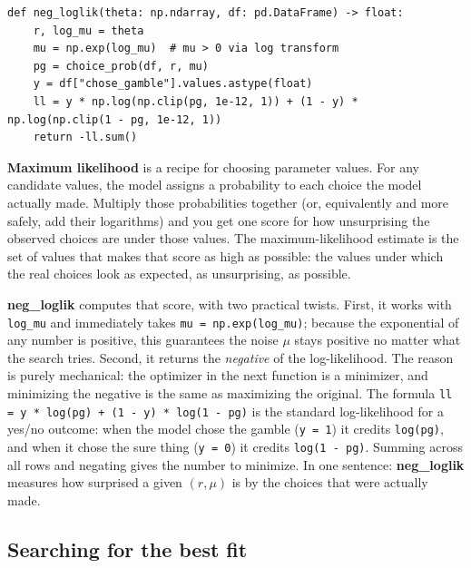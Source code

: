 \documentclass[11pt]{article}
\newcommand{\term}[1]{\textbf{\color{mossdk}#1}}
\newcommand{\file}[1]{\textbf{\ttfamily #1}}
\begin{document}
\begin{lstlisting}[style=py,firstnumber=49]
def neg_loglik(theta: np.ndarray, df: pd.DataFrame) -> float:
    r, log_mu = theta
    mu = np.exp(log_mu)  # mu > 0 via log transform
    pg = choice_prob(df, r, mu)
    y = df["chose_gamble"].values.astype(float)
    ll = y * np.log(np.clip(pg, 1e-12, 1)) + (1 - y) * np.log(np.clip(1 - pg, 1e-12, 1))
    return -ll.sum()
\end{lstlisting}

\begin{defbox}
\term{Maximum likelihood} is a recipe for choosing parameter values. For any candidate values, the
model assigns a probability to each choice the model actually made. Multiply those probabilities
together (or, equivalently and more safely, add their logarithms) and you get one score for how
unsurprising the observed choices are under those values. The maximum-likelihood estimate is the set
of values that makes that score as high as possible: the values under which the real choices look as
expected, as unsurprising, as possible.
\end{defbox}

\file{neg\_loglik} computes that score, with two practical twists. First, it works with
\verb|log_mu| and immediately takes \verb|mu = np.exp(log_mu)|; because the exponential of any number
is positive, this guarantees the noise $\mu$ stays positive no matter what the search tries. Second,
it returns the \emph{negative} of the log-likelihood. The reason is purely mechanical: the optimizer
in the next function is a minimizer, and minimizing the negative is the same as maximizing the
original. The formula
\verb|ll = y * log(pg) + (1 - y) * log(1 - pg)| is the standard log-likelihood for a yes/no outcome:
when the model chose the gamble (\verb|y = 1|) it credits \verb|log(pg)|, and when it chose the sure
thing (\verb|y = 0|) it credits \verb|log(1 - pg)|. Summing across all rows and negating gives the
number to minimize. In one sentence: \file{neg\_loglik} measures how surprised a given $(r, \mu)$ is
by the choices that were actually made.

\subsection{Searching for the best fit}
\end{document}
